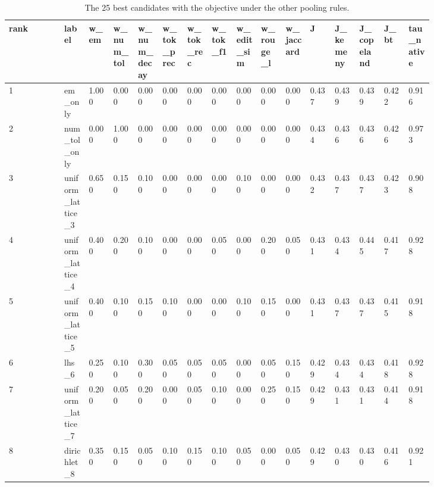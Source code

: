 \begin{landscape}
\tiny
\setlength{\tabcolsep}{3pt}
\begin{longtable}{p{0.098\linewidth}p{0.049\linewidth}p{0.049\linewidth}p{0.049\linewidth}p{0.049\linewidth}p{0.049\linewidth}p{0.049\linewidth}p{0.049\linewidth}p{0.049\linewidth}p{0.049\linewidth}p{0.049\linewidth}p{0.049\linewidth}p{0.049\linewidth}p{0.049\linewidth}p{0.049\linewidth}p{0.049\linewidth}}
\caption{The 25 best candidates with the objective under the other pooling rules.}\label{tab:grid_top25}\\
\toprule
rank & label & w\_\allowbreak{}em & w\_\allowbreak{}num\_\allowbreak{}tol & w\_\allowbreak{}num\_\allowbreak{}decay & w\_\allowbreak{}tok\_\allowbreak{}prec & w\_\allowbreak{}tok\_\allowbreak{}rec & w\_\allowbreak{}tok\_\allowbreak{}f1 & w\_\allowbreak{}edit\_\allowbreak{}sim & w\_\allowbreak{}rouge\_\allowbreak{}l & w\_\allowbreak{}jaccard & J & J\_\allowbreak{}kemeny & J\_\allowbreak{}copeland & J\_\allowbreak{}bt & tau\_\allowbreak{}native \\
\midrule
1 & em\_\allowbreak{}only & 1.000 & 0.000 & 0.000 & 0.000 & 0.000 & 0.000 & 0.000 & 0.000 & 0.000 & 0.437 & 0.439 & 0.439 & 0.422 & 0.916 \\
2 & num\_\allowbreak{}tol\_\allowbreak{}only & 0.000 & 1.000 & 0.000 & 0.000 & 0.000 & 0.000 & 0.000 & 0.000 & 0.000 & 0.434 & 0.436 & 0.436 & 0.426 & 0.973 \\
3 & uniform\_\allowbreak{}lattice\_\allowbreak{}3 & 0.650 & 0.150 & 0.100 & 0.000 & 0.000 & 0.000 & 0.100 & 0.000 & 0.000 & 0.432 & 0.437 & 0.437 & 0.423 & 0.908 \\
4 & uniform\_\allowbreak{}lattice\_\allowbreak{}4 & 0.400 & 0.200 & 0.100 & 0.000 & 0.000 & 0.050 & 0.000 & 0.200 & 0.050 & 0.431 & 0.434 & 0.445 & 0.417 & 0.928 \\
5 & uniform\_\allowbreak{}lattice\_\allowbreak{}5 & 0.400 & 0.100 & 0.150 & 0.100 & 0.000 & 0.000 & 0.100 & 0.150 & 0.000 & 0.431 & 0.437 & 0.437 & 0.415 & 0.918 \\
6 & lhs\_\allowbreak{}6 & 0.250 & 0.100 & 0.300 & 0.050 & 0.050 & 0.050 & 0.000 & 0.050 & 0.150 & 0.429 & 0.434 & 0.434 & 0.418 & 0.928 \\
7 & uniform\_\allowbreak{}lattice\_\allowbreak{}7 & 0.200 & 0.050 & 0.200 & 0.000 & 0.050 & 0.100 & 0.000 & 0.250 & 0.150 & 0.429 & 0.431 & 0.431 & 0.414 & 0.918 \\
8 & dirichlet\_\allowbreak{}8 & 0.350 & 0.150 & 0.050 & 0.100 & 0.150 & 0.100 & 0.050 & 0.000 & 0.050 & 0.429 & 0.430 & 0.430 & 0.416 & 0.921 \\

\end{longtable}
\end{landscape}
